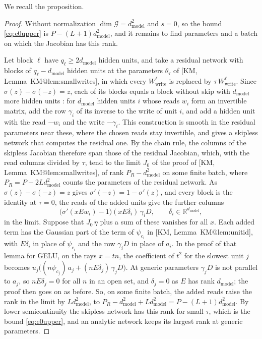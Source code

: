 \documentclass[10pt]{article}
\makeatletter
\theoremstyle{definition}
\theoremstyle{remark}
\newcommand{\R}{\mathbb{R}}
\newcommand{\Wwrite}{W_{\mathrm{write}}}
\newcommand{\dm}{d_{\mathrm{model}}}
\newcommand{\G}{\mathcal{G}}
\newcommand{\KMn}[1]{\csname KM@#1\endcsname}
\newcommand{\KM}[2]{[KM, #1~\KMn{#2}]}
\makeatother
\begin{document}
We recall the proposition.

\propWideGelu*

\begin{proof}
Without normalization $\dim\G = \dm^2$ and $s = 0$, so the bound \eqref{eq:e0upper} is $P - (L+1)\dm^2$, and it remains to find parameters and a batch on which the Jacobian has this rank.

Let block $\ell$ have $q_\ell \ge 2\dm$ hidden units, and take a residual network with blocks of $q_\ell - \dm$ hidden units at the parameters $\theta_\tau$ of \KM{Lemma}{lem:smallwrites}, in which every $\Wwrite^{\ell}$ is replaced by $\tau\,\Wwrite^{\ell}$. Since $\sigma(z) - \sigma(-z) = z$, each of its blocks equals a block without skip with $\dm$ more hidden units \citep{mijoski2026worth}: for $\dm$ hidden units $i$ whose reads $w_i$ form an invertible matrix, add the row $\gamma_i$ of its inverse to the write of unit $i$, and add a hidden unit with the read $-w_i$ and the write $-\gamma_i$. This construction is smooth in the residual parameters near these, where the chosen reads stay invertible, and gives a skipless network that computes the residual one. By the chain rule, the columns of the skipless Jacobian therefore span those of the residual Jacobian, which, with the read columns divided by $\tau$, tend to the limit $J_0$ of the proof of \KM{Lemma}{lem:smallwrites}, of rank $P_R - \dm^2$ on some finite batch, where $P_R = P - 2L\dm^2$ counts the parameters of the residual network. As $\sigma(z) - \sigma(-z) = z$ gives $\sigma'(-z) = 1 - \sigma'(z)$, and every block is the identity at $\tau = 0$, the reads of the added units give the further columns
\[
\big(\sigma'(xEw_i) - 1\big)(xE\delta_i)\,\gamma_iD,\qquad \delta_i \in \R^{\dm},
\]
in the limit. Suppose that $J_0\,\eta$ plus a sum of these vanishes for all $x$. Each added term has the Gaussian part of the term of $\psi_{c_i}$ in \KM{Lemma}{lem:unitid}, with $E\delta_i$ in place of $\psi_{c_i}$ and the row $\gamma_iD$ in place of $a_i$. In the proof of that lemma for GELU, on the rays $x = tn$, the coefficient of $t^2$ for the slowest unit $j$ becomes $u_j\big((n\psi_{c_j})\,a_j + (nE\delta_j)\,\gamma_jD\big)$. At generic parameters $\gamma_jD$ is not parallel to $a_j$, so $nE\delta_j = 0$ for all $n$ in an open set, and $\delta_j = 0$ as $E$ has rank $\dm$; the proof then goes on as before. So, on some finite batch, the added reads raise the rank in the limit by $L\dm^2$, to $P_R - \dm^2 + L\dm^2 = P - (L+1)\dm^2$. By lower semicontinuity the skipless network has this rank for small $\tau$, which is the bound \eqref{eq:e0upper}, and an analytic network keeps its largest rank at generic parameters.
\end{proof}
\end{document}
